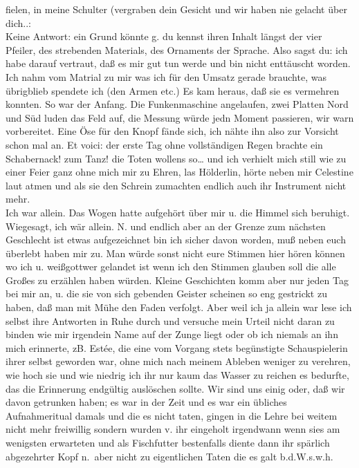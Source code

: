 \documentclass[
]{article}
\begin{document}
fielen, in meine Schulter (vergraben dein Gesicht und wir haben nie
gelacht über dich..:\\
Keine Antwort: ein Grund könnte g. du kennst ihren Inhalt längst der
vier Pfeiler, des strebenden Materials, des Ornaments der Sprache. Also
sagst du: ich habe darauf vertraut, daß es mir gut tun werde und bin
nicht enttäuscht worden. Ich nahm vom Matrial zu mir was ich für den
Umsatz gerade brauchte, was übrigblieb spendete ich (den Armen etc.) Es
kam heraus, daß sie es vermehren konnten. So war der Anfang. Die
Funkenmaschine angelaufen, zwei Platten Nord und Süd luden das Feld auf,
die Messung würde jedn Moment passieren, wir warn vorbereitet. Eine Öse
für den Knopf fände sich, ich nähte ihn also zur Vorsicht schon mal an.
Et voici: der erste Tag ohne vollständigen Regen brachte ein
Schabernack! zum Tanz! die Toten wollens so\ldots{} und ich verhielt
mich still wie zu einer Feier ganz ohne mich mir zu Ehren, las
Hölderlin, hörte neben mir Celestine laut atmen und als sie den Schrein
zumachten endlich auch ihr Instrument nicht mehr.\\
Ich war allein. Das Wogen hatte aufgehört über mir u. die Himmel sich
beruhigt. Wiegesagt, ich wär allein. N. und endlich aber an der Grenze
zum nächsten Geschlecht ist etwas aufgezeichnet bin ich sicher davon
worden, muß neben euch überlebt haben mir zu. Man würde sonst nicht eure
Stimmen hier hören können wo ich u. weißgottwer gelandet ist wenn ich
den Stimmen glauben soll die alle Großes zu erzählen haben würden.
Kleine Geschichten komm aber nur jeden Tag bei mir an, u. die sie von
sich gebenden Geister scheinen so eng gestrickt zu haben, daß man mit
Mühe den Faden verfolgt. Aber weil ich ja allein war lese ich selbst
ihre Antworten in Ruhe durch und versuche mein Urteil nicht daran zu
binden wie mir irgendein Name auf der Zunge liegt oder ob ich niemals an
ihn mich erinnerte, zB. Estée, die eine vom Vorgang stets begünstigte
Schauspielerin ihrer selbst geworden war, ohne mich nach meinem Ableben
weniger zu verehren, wie hoch sie und wie niedrig ich ihr nur kaum das
Wasser zu reichen es bedurfte, das die Erinnerung endgültig auslöschen
sollte. Wir sind uns einig oder, daß wir davon getrunken haben; es war
in der Zeit und es war ein übliches Aufnahmeritual damals und die es
nicht taten, gingen in die Lehre bei weitem nicht mehr freiwillig
sondern wurden v. ihr eingeholt irgendwann wenn sies am wenigsten
erwarteten und als Fischfutter bestenfalls diente dann ihr spärlich
abgezehrter Kopf n.~aber nicht zu eigentlichen Taten die es galt
b.d.W.s.w.h.\\
\end{document}
